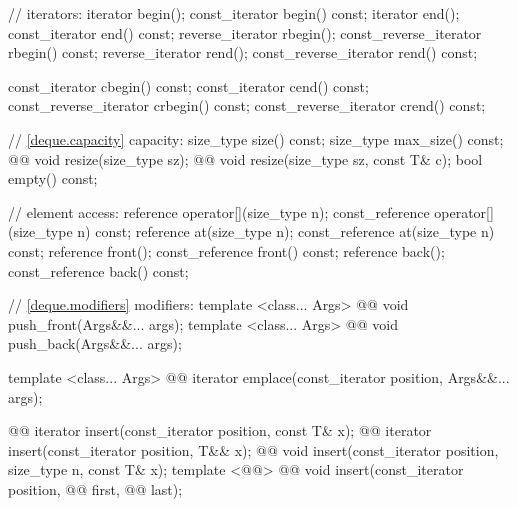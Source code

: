 \documentclass[american,twoside]{book}
\begin{document}
\begin{codeblock}
{{    // iterators:
    iterator               begin();
    const_iterator         begin() const;
    iterator               end();
    const_iterator         end() const;
    reverse_iterator       rbegin();
    const_reverse_iterator rbegin() const;
    reverse_iterator       rend();
    const_reverse_iterator rend() const;

    const_iterator         cbegin() const;
    const_iterator         cend() const;
    const_reverse_iterator crbegin() const;
    const_reverse_iterator crend() const;

    // \ref{deque.capacity} capacity:
    size_type size() const;
    size_type max_size() const;
    @@ 
      void resize(size_type sz);
    @@    
      void resize(size_type sz, const T& c);
    bool empty() const;

    // element access:
    reference       operator[](size_type n);
    const_reference operator[](size_type n) const;
    reference       at(size_type n);
    const_reference at(size_type n) const;
    reference       front();
    const_reference front() const;
    reference       back();
    const_reference back() const;

    // \ref{deque.modifiers} modifiers:
    template <class... Args> 
      @@ 
      void push_front(Args&&... args);
    template <class... Args> 
      @@ 
      void push_back(Args&&... args);

    template <class... Args> 
      @@ 
      iterator emplace(const_iterator position, Args&&... args);

    @@
      iterator insert(const_iterator position, const T& x);
    @@
      iterator insert(const_iterator position, T&& x);
    @@
      void insert(const_iterator position, size_type n, const T& x);
    template <@@>
      @@
      void insert(const_iterator position, @@ first, @@ last);

}}
\end{codeblock}
\end{document}
